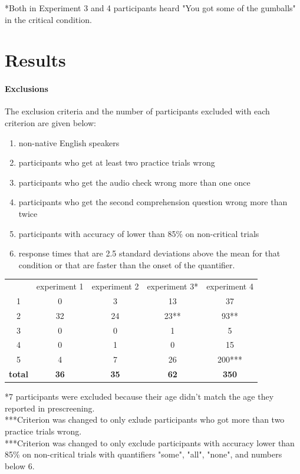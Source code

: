 \documentclass[12pt]{article}
\begin{document}
*Both in Experiment 3 and 4 participants heard "You got some of the gumballs" in the critical condition.

\section{Results}

\paragraph{Exclusions}
The exclusion criteria and the number of participants excluded with each criterion are given below:

\begin{enumerate}
\item non-native English speakers 
\item participants who get at least two practice trials wrong 
\item participants who get the audio check wrong more than one once 
\item participants who get the second comprehension question wrong more than twice 
\item participants with accuracy of lower than 85\% on non-critical trials 
\item response times that are 2.5 standard deviations above the mean for that condition or that are faster than the onset of the quantifier.
\end{enumerate}

\begin{table}[h]
    \begin{tabular}{ccccc}
     & experiment 1 & experiment 2  & experiment 3*  & experiment 4 \\
    1 & 0 & 3 & 13 & 37 \\
    2 & 32 & 24 & 23** & 93** \\
    3 & 0 & 0 & 1 & 5 \\
    4 & 0 & 1 & 0 & 15 \\
    5 & 4 & 7 & 26 & 200*** \\
    \textbf{total} & \textbf{36} & \textbf{35} & \textbf{62} & \textbf{350} \\
    \end{tabular}
\end{table}

    *7 participants were excluded because their age didn't match the age they reported in prescreening. \\ 
    ***Criterion was changed to only exlude participants who got more than two practice trials wrong. \\
    ***Criterion was changed to only exclude participants with accuracy lower than 85\% on non-critical trials with quantifiers "some", "all", "none", and numbers below 6.
\end{document}
